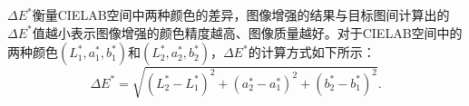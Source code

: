 \documentclass[
    type = master, %
    degree = academic,        %
    decl-page,  %
  ]{njuthesis}
\begin{document}
$\Delta E^*$衡量CIELAB空间中两种颜色的差异，图像增强的结果与目标图间计算出的$\Delta E^*$值越小表示图像增强的颜色精度越高、图像质量越好。对于CIELAB空间中的两种颜色$(L_{1}^*, a_{1}^*, b_{1}^*)$和$(L_{2}^*, a_{2}^*, b_{2}^*)$，$\Delta E^*$的计算方式如下所示：
\begin{equation}
\Delta E^*=\sqrt{\left(L_2^*-L_1^*\right)^2+\left(a_2^*-a_1^*\right)^2+\left(b_2^*-b_1^*\right)^2}.
\end{equation}

\end{document}
